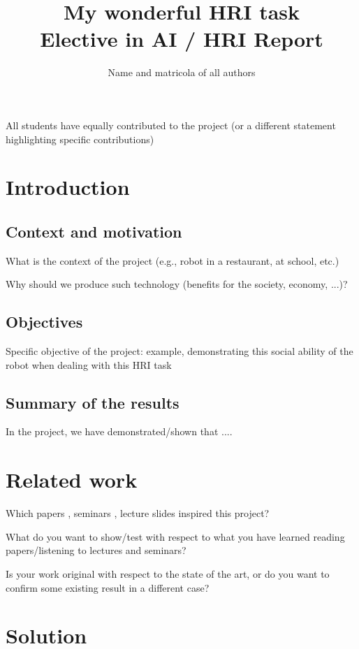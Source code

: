 \documentclass{article}
\title{My wonderful HRI task \\
Elective in AI / HRI Report}
\author{Name and matricola of all authors}
\date{}
\begin{document}
\maketitle

All students have equally contributed to the project (or a different statement highlighting specific contributions)

\section{Introduction}

\subsection{Context and motivation}

What is the context of the project (e.g., robot in a restaurant, at school, etc.)

Why should we produce such technology (benefits for the society, economy, ...)?


\subsection{Objectives}
\label{sec:obj}

Specific objective of the project:
example, demonstrating this social ability of the robot when dealing with this HRI task

\subsection{Summary of the results}

In the project, we have demonstrated/shown that  ....



\section{Related work}

Which papers \cite{HRIpaper}, seminars \cite{HRIseminar}, lecture slides \cite{HRIslides}  inspired this project?

What do you want to show/test with respect to what you have learned reading papers/listening to lectures and seminars?

Is your work original with respect to the state of the art, or do you want to confirm some existing result in a different case?


\section{Solution}
\end{document}
